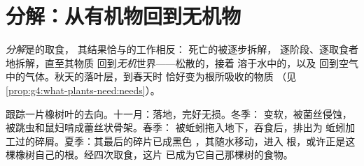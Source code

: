 \section{分解：从有机物回到无机物}

\begin{proposition}[分解的作用]\label{prop:g6:decomposers-and-soil:decomposition}
\emph{分解}是的取食，
其结果恰与的工作相反：
死亡的\emph{}被逐步拆解，
逐阶段、逐取食者地拆解，直至其物质
回到\emph{无机}世界——松散的，接着
溶于水中的，以及
回到空气中的气体。秋天的落叶层，到春天时
恰好变为根所吸收的物质
（见\cref{prop:g4:what-plants-need:needs}）。
\end{proposition}
\admitted

\begin{example}[落叶的最后一年]\label{ex:g6:decomposers-and-soil:leaf}
跟踪一片橡树叶的去向。十一月：落地，完好无损。冬季：
变软，被菌丝侵蚀，
被跳虫和鼠妇啃成蕾丝状骨架。春季：
被蚯蚓拖入地下，吞食后，排出为
蚯蚓加工过的碎屑。夏季：其最后的碎片已成黑色
，其随水移动，进入
根，或许正是这棵橡树自己的根。经四次取食，这片
已成为它自己那棵树的食物。
\end{example}

